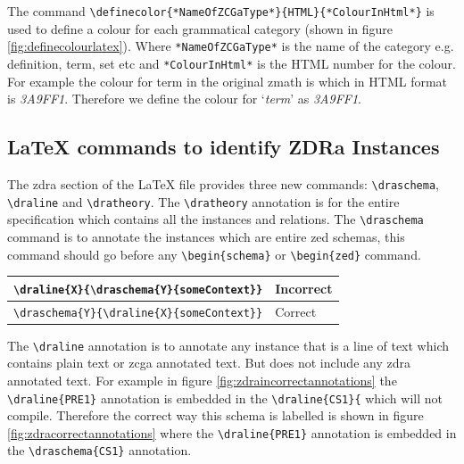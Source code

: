 The command \verb|\definecolor{*NameOfZCGaType*}{HTML}{*ColourInHtml*}| is used
to define a colour for each grammatical category (shown in figure
\ref{fig:definecolourlatex}). Where \verb|*NameOfZCGaType*| is the name of the
category e.g. definition, term, set etc and \verb|*ColourInHtml*| is the HTML
number for the colour. For example the colour for term in the original
\gls{zmath} is  which in HTML format is \emph{3A9FF1}.
Therefore we define the colour for `\emph{term}' as \emph{3A9FF1}.

\subsection{\LaTeX{} commands to identify ZDRa Instances}

The \gls{zdra} section of the \LaTeX{} file provides three new commands:
\verb|\draschema|, \verb|\draline| and \verb|\dratheory|. The \verb|\dratheory|
annotation is for the entire specification which contains all the instances and
relations. The \verb|\draschema| command is to annotate the instances which are
entire zed schemas, this command should go before any \verb|\begin{schema}| or
\verb|\begin{zed}| command.

\begin{tabular}{|l | l|}
\hline
\verb|\draline{X}{\draschema{Y}{someContext}}| & {\color{set}Incorrect} \\
\hline
\verb|\draschema{Y}{\draline{X}{someContext}}| & {\color{set}Correct} \\
\hline
\end{tabular}

 The \verb|\draline| annotation is to annotate any instance that is a line of
 text which contains plain text or \gls{zcga} annotated text. But does not
 include any \gls{zdra} annotated text. For example in figure
 \ref{fig:zdraincorrectannotations} the \verb|\draline{PRE1}| annotation is
 embedded in the \verb|\draline{CS1}{| which will not compile. Therefore the
 correct way this schema is labelled is shown in figure
 \ref{fig:zdracorrectannotations} where the \verb|\draline{PRE1}| annotation is
 embedded in the \verb|\draschema{CS1}| annotation.

